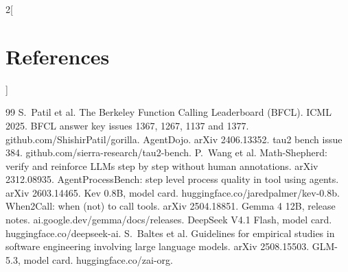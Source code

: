 \documentclass[10pt,a4paper]{article}
\begin{document}
\begin{multicols}{2}[\section*{References}\vspace{-2pt}]
\begin{thebibliography}{99}
 S.\ Patil et al. The Berkeley Function Calling Leaderboard (BFCL). ICML 2025.
 BFCL answer key issues 1367, 1267, 1137 and 1377. github.com/ShishirPatil/gorilla.
 AgentDojo. arXiv 2406.13352.
 tau2 bench issue 384. github.com/sierra-research/tau2-bench.
 P.\ Wang et al. Math-Shepherd: verify and reinforce LLMs step by step without human annotations. arXiv 2312.08935.
 AgentProcessBench: step level process quality in tool using agents. arXiv 2603.14465.
 Kev 0.8B, model card. huggingface.co/jaredpalmer/kev-0.8b.
 When2Call: when (not) to call tools. arXiv 2504.18851.
 Gemma 4 12B, release notes. ai.google.dev/gemma/docs/releases.
 DeepSeek V4.1 Flash, model card. huggingface.co/deepseek-ai.
 S.\ Baltes et al. Guidelines for empirical studies in software engineering involving large language models. arXiv 2508.15503.
 GLM-5.3, model card. huggingface.co/zai-org.
\end{thebibliography}
\end{multicols}
\end{document}
